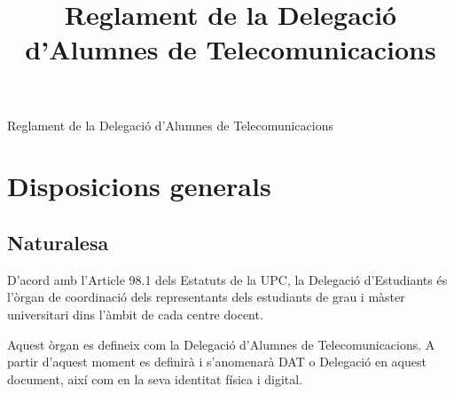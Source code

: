 \documentclass[a4paper,12pt]{article}
\title{Reglament de la Delegació d'Alumnes de Telecomunicacions}
\begin{document}
\thispagestyle{empty}
\begin{center}
\Huge
Reglament de la Delegació d'Alumnes de Telecomunicacions\\
\end{center}
\normalsize
\newpage

\tableofcontents
\newpage


\section{Disposicions generals}
\subsection{Naturalesa}
D’acord amb l’Article 98.1 dels Estatuts de la UPC, la Delegació d’Estudiants és l’òrgan de coordinació dels representants dels estudiants de grau i màster universitari dins l’àmbit de cada centre docent.

Aquest òrgan es defineix com la Delegació d’Alumnes de Telecomunicacions. A partir d’aquest moment es definirà i s’anomenarà DAT o Delegació en aquest document, així com en la seva identitat física i digital.
\end{document}
